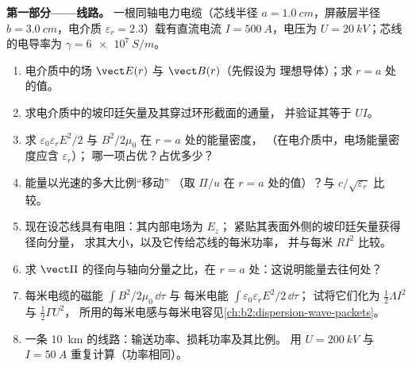 \begin{problem}
\label{pb:b2:poynting-vector:1}

\medskip
\noindent\textbf{第一部分——线路。}
一根同轴电力电缆（芯线半径 $a = \qty{1.0}{cm}$，屏蔽层半径 $b =
\qty{3.0}{cm}$，电介质 $\varepsilon_r = 2.3$）载有直流电流 $I =
\qty{500}{A}$，电压为 $U = \qty{20}{kV}$；芯线的电导率为 $\gamma =
\qty{6e7}{S/m}$。
\begin{enumerate}
  \item 电介质中的场 $\vect E(r)$ 与 $\vect B(r)$（先假设为
        理想导体）；求 $r = a$ 处的值。
  \item 求电介质中的坡印廷矢量及其穿过环形截面的通量，
        并验证其等于 $UI$。
  \item 求 $\varepsilon_0\varepsilon_rE^2/2$ 与 $B^2/2\mu_0$ 在 $r = a$ 处的能量密度，
        （在电介质中，电场能量密度应含 $\varepsilon_r$）；
        哪一项占优？占优多少？
  \item 能量以光速的多大比例“移动”
        （取 $\Pi/u$ 在 $r = a$ 处的值）？与 $c/\sqrt{\varepsilon_r}$ 比较。
  \item 现在设芯线具有电阻：其内部电场为 $E_z$；
        紧贴其表面外侧的坡印廷矢量获得径向分量，
        求其大小，以及它传给芯线的每米功率，
        并与每米 $RI^2$ 比较。
  \item 求 $\vect\Pi$ 的径向与轴向分量之比，在 $r =
        a$ 处：这说明能量去往何处？
  \item 每米电缆的磁能 $\int B^2/2\mu_0\,\dd\tau$ 与
        每米电能 $\int\varepsilon_0\varepsilon_rE^2/2\,\dd\tau$；
        试将它们化为 $\tfrac12\Lambda I^2$ 与 $\tfrac12\Gamma U^2$，
        所用的每米电感与每米电容见\cref{ch:b2:dispersion-wave-packets}。
  \item 一条 \qty{10}{km} 的线路：输送功率、损耗功率及其比例。
        用 $U = \qty{200}{kV}$ 与 $I = \qty{50}{A}$ 重复计算（功率相同）。
\end{enumerate}


\end{problem}
